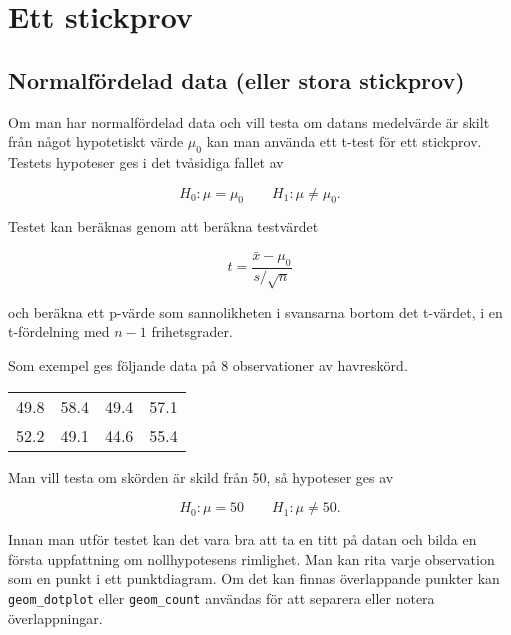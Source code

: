 \documentclass[
]{book}
\theoremstyle{definition}
\theoremstyle{definition}
\theoremstyle{definition}
\theoremstyle{definition}
\theoremstyle{remark}
\begin{document}
\hypertarget{ett-stickprov}{%
\chapter{Ett stickprov}\label{ett-stickprov}}

\hypertarget{normalfuxf6rdelad-data-eller-stora-stickprov}{%
\section{Normalfördelad data (eller stora stickprov)}\label{normalfuxf6rdelad-data-eller-stora-stickprov}}

Om man har normalfördelad data och vill testa om datans medelvärde är skilt från något hypotetiskt värde \(\mu_0\) kan man använda ett t-test för ett stickprov. Testets hypoteser ges i det tvåsidiga fallet av

\[H_0: \mu = \mu_0 \qquad H_1: \mu \neq \mu_0.\]

Testet kan beräknas genom att beräkna testvärdet

\[t = \frac{\bar x - \mu_0}{s / \sqrt n}\]

och beräkna ett p-värde som sannolikheten i svansarna bortom det t-värdet, i en t-fördelning med \(n-1\) frihetsgrader.

Som exempel ges följande data på 8 observationer av havreskörd.

\begin{table}
\centering
\begin{tabular}[t]{rrrr}
\toprule
49.8 & 58.4 & 49.4 & 57.1\\
52.2 & 49.1 & 44.6 & 55.4\\
\bottomrule
\end{tabular}
\end{table}

Man vill testa om skörden är skild från 50, så hypoteser ges av

\[H_0: \mu = 50 \qquad H_1: \mu \neq 50.\]

Innan man utför testet kan det vara bra att ta en titt på datan och bilda en första uppfattning om nollhypotesens rimlighet. Man kan rita varje observation som en punkt i ett punktdiagram. Om det kan finnas överlappande punkter kan \texttt{geom\_dotplot} eller \texttt{geom\_count} användas för att separera eller notera överlappningar.
\end{document}
